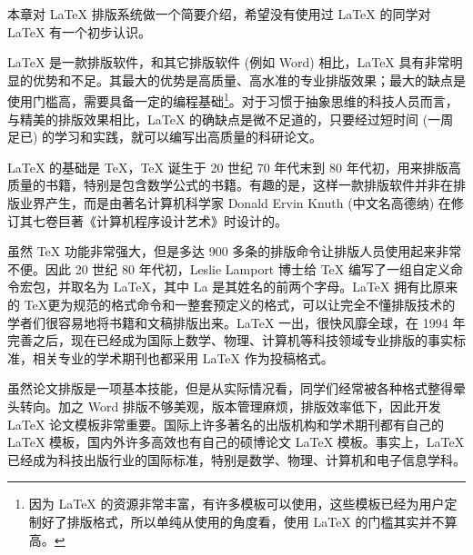 

本章对 \LaTeX{} 排版系统做一个简要介绍，希望没有使用过 \LaTeX{} 的同学对 \LaTeX{} 有一个初步认识。


\LaTeX{} 是一款排版软件，和其它排版软件 (例如 Word) 相比，\LaTeX{} 具有非常明显的优势和不足。其最大的优势是高质量、高水准的专业排版效果；最大的缺点是使用门槛高，需要具备一定的编程基础\footnote{因为 \LaTeX{} 的资源非常丰富，有许多模板可以使用，这些模板已经为用户定制好了排版格式，所以单纯从使用的角度看，使用 \LaTeX{} 的门槛其实并不算高。}。对于习惯于抽象思维的科技人员而言，与精美的排版效果相比，\LaTeX{} 的确缺点是微不足道的，只要经过短时间 (一周足已) 的学习和实践，就可以编写出高质量的科研论文。

\LaTeX{} 的基础是 \TeX，\TeX{} 诞生于 20 世纪 70 年代末到 80 年代初，用来排版高质量的书籍，特别是包含数学公式的书籍。有趣的是，这样一款排版软件并非在排版业界产生，而是由著名计算机科学家 Donald Ervin Knuth (中文名高德纳) 在修订其七卷巨著《计算机程序设计艺术》时设计的。%

虽然 \TeX{} 功能非常强大，但是多达 900 多条的排版命令让排版人员使用起来非常不便。因此 20 世纪 80 年代初，Leslie Lamport 博士给 \TeX{} 编写了一组自定义命令宏包，并取名为 \LaTeX，其中 La 是其姓名的前两个字母。\LaTeX{} 拥有比原来的 \TeX 更为规范的格式命令和一整套预定义的格式，可以让完全不懂排版技术的学者们很容易地将书籍和文稿排版出来。\LaTeX{} 一出，很快风靡全球，在 1994 年 \LaTeXe{} 完善之后，现在已经成为国际上数学、物理、计算机等科技领域专业排版的事实标准，相关专业的学术期刊也都采用 \LaTeX{} 作为投稿格式。%


虽然论文排版是一项基本技能，但是从实际情况看，同学们经常被各种格式整得晕头转向。加之 Word 排版不够美观，版本管理麻烦，排版效率低下，因此开发 \LaTeX{} 论文模板非常重要。国际上许多著名的出版机构和学术期刊都有自己的 \LaTeX{} 模板，国内外许多高效也有自己的硕博论文 \LaTeX{} 模板。事实上，\LaTeX{} 已经成为科技出版行业的国际标准，特别是数学、物理、计算机和电子信息学科。%


